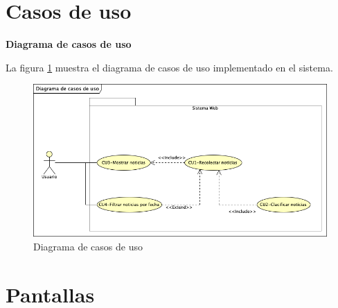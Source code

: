 \newpage
\section{Casos de uso}


\Large{\textbf{Diagrama de casos de uso}}\\
\normalsize{}

La figura \ref{fig:DCU} muestra el diagrama de casos de uso implementado en el sistema.

\begin{figure}
  \centering
  \includegraphics[scale=.5]{imagenes/Diagramas/CasosDeuso}
  \caption{Diagrama de casos de uso}
  \label{fig:DCU}
\end{figure}



\newpage

\newpage

\newpage

\newpage

\section{Pantallas}


\newpage

\newpage

\newpage

\newpage




